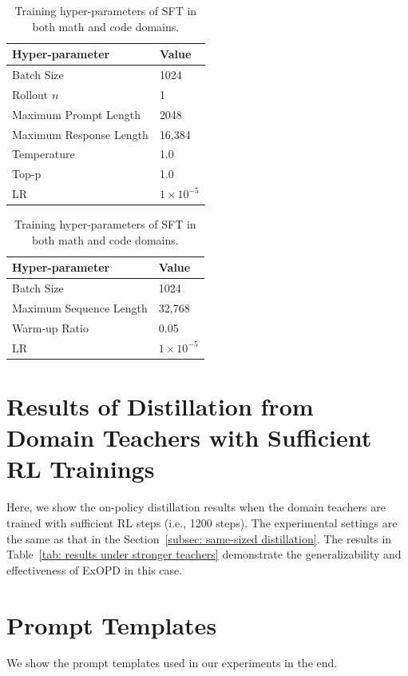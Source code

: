 \documentclass{article} %
\begin{document}
\begin{table}[t]  
\begin{center}
\begin{minipage}[t]{0.48\linewidth}
\caption{Training hyper-parameters of G-OPD in both math and code domains.}
\label{tab: G-OPD hyper-parameters}
\centering
\begin{tabular}{ll}
\toprule
Hyper-parameter & Value \\
\midrule
Batch Size & 1024  \\
Rollout $n$ & 1 \\
Maximum Prompt Length & 2048 \\
Maximum Response Length & 16,384 \\
Temperature & 1.0 \\
Top-p & 1.0 \\
LR & $1\times 10^{-5}$ \\
\bottomrule
\end{tabular}
\end{minipage}  
\hfil
\begin{minipage}[t]{0.48\linewidth}
\caption{Training hyper-parameters of SFT in both math and code domains.}
\label{tab: SFT hyper-parameters}
\centering
\begin{tabular}{ll}
\toprule
Hyper-parameter & Value \\
\midrule
Batch Size & 1024  \\
Maximum Sequence Length & 32,768 \\
Warm-up Ratio & 0.05 \\
LR & $1\times 10^{-5}$ \\
\bottomrule
\end{tabular}
\end{minipage} 
\end{center}
\end{table}



\section{Results of Distillation from Domain Teachers with Sufficient RL Trainings}
\label{appendix: results under stronger teachers}
Here, we show the on-policy distillation results when the domain teachers are trained with sufficient RL steps (i.e., 1200 steps). The experimental settings are the same as that in the Section~\ref{subsec: same-sized distillation}. The results in Table~\ref{tab: results under stronger teachers} demonstrate the generalizability and effectiveness of ExOPD in this case.




\section{Prompt Templates}
\label{appendix: prompt templates}
We show the prompt templates used in our experiments in the end.
\clearpage


\end{document}
